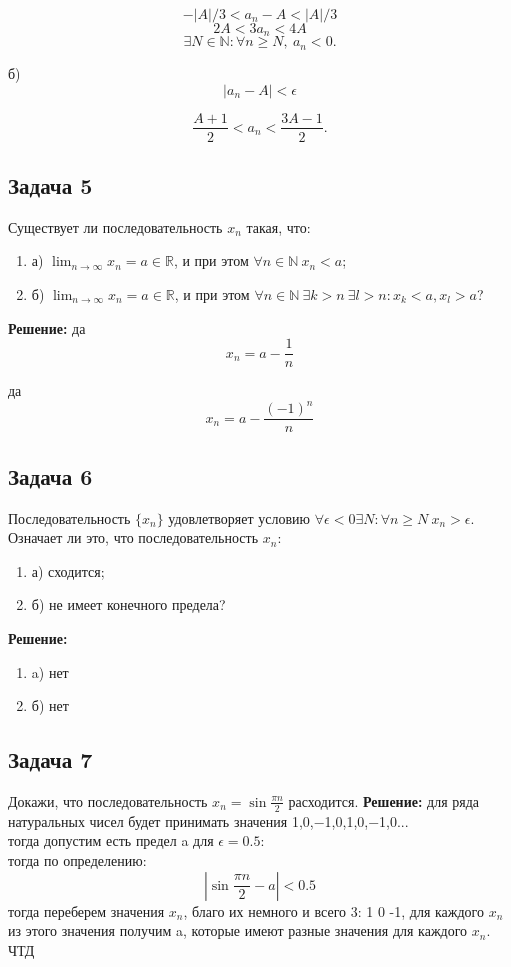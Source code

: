 \documentclass[a4paper,12pt]{article}
\begin{document}
\[
-|A|/3<a_n-A<|A|/3
\]
\[
2A<3a_n<4A
\]
\[
\exists N \in \mathbb{N} : \forall n \geq N, \ a_n < 0.
\]

б)
\[
|a_n-A|<\epsilon 
\]


\[
\frac{A + 1}{2} < a_n < \frac{3A - 1}{2}.
\]

\subsection{Задача 5}
Существует ли последовательность $x_n$ такая, что:
\begin{enumerate}
    \item а) $\lim_{n \to \infty} x_n = a \in \mathbb{R}$, и при этом $\forall n \in \mathbb{N} \ x_n < a$;
    \item б) $\lim_{n \to \infty} x_n = a \in \mathbb{R}$, и при этом $\forall n \in \mathbb{N} \ \exists k > n \ \exists l > n : x_k < a, x_l > a$?
\end{enumerate}
\textbf{Решение:}
да
\[
x_n=a-\frac{1}{n}
\]

да
\[
x_n=a-\frac{(-1)^n}{n}
\]
\subsection{Задача 6}
Последовательность $\{x_n\}$ удовлетворяет условию $\forall \epsilon < 0 \exists N : \forall n \geq N \ x_n > \epsilon$. Означает ли это, что последовательность $x_n$:
\begin{enumerate}
    \item а) сходится;
    \item б) не имеет конечного предела?
\end{enumerate}
\textbf{Решение:}
\begin{enumerate}
    \item a) нет
    \item б) нет
\end{enumerate}
\subsection{Задача 7}
Докажи, что последовательность $x_n = \sin \frac{\pi n}{2}$ расходится.
\textbf{Решение: }
для ряда натуральных чисел будет принимать значения 1,0,−1,0,1,0,−1,0...\\
тогда допустим есть предел a для $\epsilon=0.5$:\\
тогда по определению:\\

\[
|\sin \frac{\pi n}{2}-a|<0.5
\]
тогда переберем значения $x_n$, благо их немного и всего 3: 1 0 -1, для каждого $x_n$ из этого значения получим a, которые имеют разные значения для каждого $x_n$. ЧТД
\end{document}
